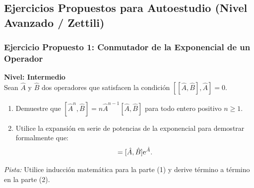 \subsection{Ejercicios Propuestos para Autoestudio (Nivel Avanzado / Zettili)}

\subsubsection[Ejercicio 1: Conmutador de la exponencial]{Ejercicio Propuesto 1: Conmutador de la Exponencial de un Operador}
\begin{ejerciciobox}
    \textbf{Nivel: Intermedio}\\
    Sean $\hat{A}$ y $\hat{B}$ dos operadores que satisfacen la condición $[[\hat{A}, \hat{B}], \hat{A}] = 0$.
    \begin{enumerate}
        \item Demuestre que $[\hat{A}^n, \hat{B}] = n\hat{A}^{n-1}[\hat{A}, \hat{B}]$ para todo entero positivo $n \ge 1$.
        \item Utilice la expansión en serie de potencias de la exponencial para demostrar formalmente que:
        \begin{equation}
            [\eu^{\hat{A}}, \hat{B}] = [\hat{A}, \hat{B}]\eu^{\hat{A}}.
        \end{equation}
    \end{enumerate}
    \textit{Pista:} Utilice inducción matemática para la parte (1) y derive término a término en la parte (2).
\end{ejerciciobox}


